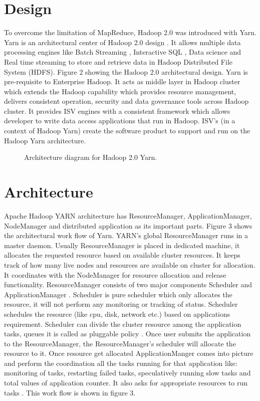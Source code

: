 \documentclass[9pt,twocolumn,twoside]{../../styles/osajnl}
\begin{document}
\section{Design}
To overcome the limitation of MapReduce, Hadoop 2.0 was introduced with Yarn. Yarn is an architectural center of Hadoop 2.0 design \cite{www-4}. It allows multiple data processing engines like Batch Streaming \cite{www-3}, Interactive SQL \cite{www-3}, Data science and Real time streaming to store and retrieve data in Hadoop Distributed File System (HDFS). Figure 2 showing the Hadoop 2.0 architectural design. Yarn is pre-requisite to Enterprise Hadoop. It acts as middle layer in Hadoop cluster which extends the Hadoop capability which provides resource management, delivers consistent operation, security and data governance tools across Hadoop cluster. It provides ISV engines with a consistent framework which allows developer to write data access applications that run in Hadoop. ISV’s (in a context of Hadoop Yarn) create the software product to support and run on the Hadoop Yarn architecture.  

\begin{figure}[htbp]
	\centering
	\caption{Architecture diagram for Hadoop 2.0 Yarn\cite{www-4}. }
	\label{fig:false-color}
\end{figure}

\section{Architecture}
Apache Hadoop YARN architecture has ResourceManager, ApplicationManager, NodeManager and distributed application as its important parts. Figure 3 shows the architectural work flow of Yarn. YARN’s global ResourceManager runs in a master daemon. Usually ResourceManager is placed in dedicated machine, it allocates the requested resource based on available cluster resources. It keeps track of how many live nodes and resources are available on cluster for allocation. It coordinates with the NodeManager for resource allocation and release functionality. ResourceManager consists of two major components Scheduler and ApplicationManager \cite{www-2}. 
Scheduler is pure scheduler which only allocates the resource, it will not perform any monitoring or tracking of status. Scheduler schedules the resource (like cpu, disk, network etc.) based on applications requirement. Scheduler can divide the cluster resource among the application tasks, queues it is called as pluggable policy \cite{www-2}. Once user submits the application to the ResourceManager, the ResourceManager’s scheduler will allocate the resource to it. Once resource get allocated ApplicationManger comes into picture and perform the coordination all the tasks running for that application like: monitoring of tasks, restarting failed tasks, speculatively running slow tasks and total values of application counter. It also asks for appropriate resources to run tasks \cite{www-4}. This work flow is shown in figure 3.
\end{document}
